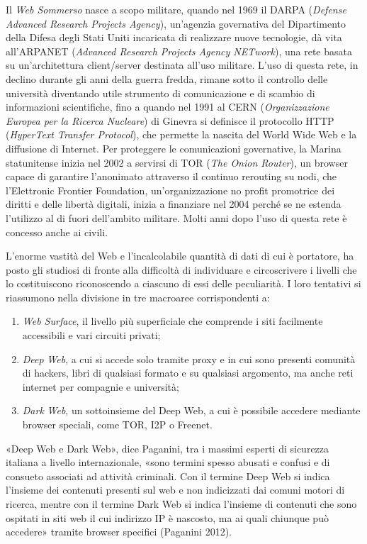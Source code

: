 \documentclass[
  b5paper,
  twoside,
  12pt,
  chapterprefix=false,
  bibliography=totocnumbered,
  parskip=false]{scrbook}
\begin{document}
Il \emph{Web Sommerso} nasce a scopo militare, quando nel 1969 il DARPA
(\emph{Defense Advanced Research Projects Agency}), un'agenzia governativa
del Dipartimento della Difesa degli Stati Uniti incaricata di realizzare
nuove tecnologie, dà vita all'ARPANET (\emph{Advanced Research Projects
Agency NETwork}), una rete basata su un'architettura client/server
destinata all'uso militare. L'uso di questa rete, in declino durante gli
anni della guerra fredda, rimane sotto il controllo delle università
diventando utile strumento di comunicazione e di scambio di informazioni
scientifiche, fino a quando nel 1991 al CERN (\emph{Organizzazione Europea
per la Ricerca Nucleare}) di Ginevra si definisce il protocollo HTTP
(\emph{HyperText Transfer Protocol}), che permette la nascita del World Wide
Web e la diffusione di Internet. Per proteggere le comunicazioni
governative, la Marina statunitense inizia nel 2002 a servirsi di TOR
(\emph{The Onion Router}), un browser capace di garantire l'anonimato
attraverso il continuo rerouting su nodi, che l'Elettronic Frontier
Foundation, un'organizzazione no profit promotrice dei diritti e delle
libertà digitali, inizia a finanziare nel 2004 perché se ne estenda
l'utilizzo al di fuori dell'ambito militare. Molti anni dopo l'uso di
questa rete è concesso anche ai civili.

L'enorme vastità del Web e l'incalcolabile quantità di dati di cui è
portatore, ha posto gli studiosi di fronte alla difficoltà di
individuare e circoscrivere i livelli che lo costituiscono riconoscendo
a ciascuno di essi delle peculiarità. I loro tentativi si riassumono
nella divisione in tre macroaree corrispondenti a:

\begin{enumerate}
\def\labelenumi{\arabic{enumi}.}
\item
  \emph{Web Surface}, il livello più superficiale che comprende i siti
  facilmente accessibili e vari circuiti privati;
\item
  \emph{Deep} \emph{Web}, a cui si accede solo tramite proxy e in cui sono
  presenti comunità di hackers, libri di qualsiasi formato e su
  qualsiasi argomento, ma anche reti internet per compagnie e
  università;
\item
  \emph{Dark} \emph{Web}, un sottoinsieme del Deep Web, a cui è possibile
  accedere mediante browser speciali, come TOR, I2P o Freenet.
\end{enumerate}

«Deep Web e Dark Web», dice Paganini, tra i massimi esperti di sicurezza
italiana a livello internazionale, «sono termini spesso abusati e
confusi e di consueto associati ad attività criminali. Con il termine
Deep Web si indica l'insieme dei contenuti presenti sul web e non
indicizzati dai comuni motori di ricerca, mentre con il termine Dark Web
si indica l'insieme di contenuti che sono ospitati in siti web il cui
indirizzo IP è nascosto, ma ai quali chiunque può accedere» tramite
browser specifici (Paganini 2012).
\end{document}
